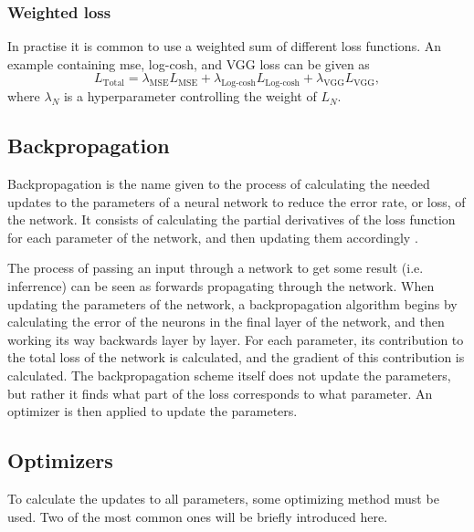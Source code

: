 \subsubsection{Weighted loss}
In practise it is common to use a weighted sum of different loss functions. 
An example containing \acrshort{mse}, log-cosh, and VGG loss can be given as
\begin{equation}
    \label{eq:weightedloss}
    L_{\text{Total}} = \lambda_{\text{MSE}}L_{\text{MSE}} + \lambda_{\text{Log-cosh}}L_{\text{Log-cosh}} + \lambda_{\text{VGG}}L_{\text{VGG}},
\end{equation}
where $\lambda_N$ is a hyperparameter controlling the weight of $L_N$. 

\subsection{Backpropagation}
Backpropagation is the name given to the process of calculating the needed updates to the parameters of a neural network to reduce the error rate, or loss, of the network. It consists of calculating the partial derivatives of the loss function for each parameter of the network, and then updating them accordingly \cite{Rumelhart1986}. 

The process of passing an input through a network to get some result (i.e. inferrence) can be seen as forwards propagating through the network. When updating the parameters of the network, a backpropagation algorithm begins by calculating the error of the neurons in the final layer of the network, and then working its way backwards layer by layer. For each parameter, its contribution to the total loss of the network is calculated, and the gradient of this contribution is calculated. The backpropagation scheme itself does not update the parameters, but rather it finds what part of the loss corresponds to what parameter. An optimizer is then applied to update the parameters.

\subsection{Optimizers}
To calculate the updates to all parameters, some optimizing method must be used. Two of the most common ones will be briefly introduced here.


